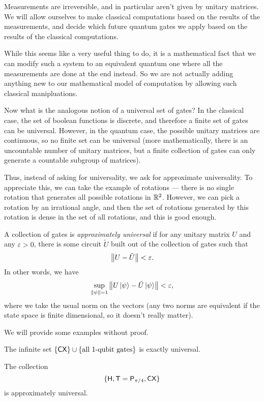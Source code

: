 Measurements are irreversible, and in particular aren't given by unitary matrices. We will allow ourselves to make classical computations based on the results of the measurements, and decide which future quantum gates we apply based on the results of the classical computations.

While this seems like a very useful thing to do, it is a mathematical fact that we can modify such a system to an equivalent quantum one where all the measurements are done at the end instead. So we are not actually adding anything new to our mathematical model of computation by allowing such classical manipluations.

Now what is the analogous notion of a universal set of gates? In the classical case, the set of boolean functions is discrete, and therefore a finite set of gates can be universal. However, in the quantum case, the possible unitary matrices are continuous, so no finite set can be universal (more mathematically, there is an uncountable number of unitary matrices, but a finite collection of gates can only generate a countable subgroup of matrices).

Thus, instead of asking for universality, we ask for approximate universality. To appreciate this, we can take the example of rotations --- there is no single rotation that generates all possible rotations in $\mathbb{R}^2$. However, we can pick a rotation by an irrational angle, and then the set of rotations generated by this rotation is dense in the set of all rotations, and this is good enough.

\begin{defi}
  A collection of gates is \emph{approximately universal} if for any unitary matrix $U$ and any $\varepsilon > 0$, there is some circuit $\tilde{U}$ built out of the collection of gates such that
  \[
    \left\lVert U - \tilde{U}\right\rVert < \varepsilon.
  \]
  In other words, we have
  \[
    \sup_{\left\lVert \psi\right\rVert = 1} \left\lVert U\left\lvert \psi\right\rangle - \tilde{U} \left\lvert \psi\right\rangle\right\rVert < \varepsilon,
  \]
  where we take the usual norm on the vectors (any two norms are equivalent if the state space is finite dimensional, so it doesn't really matter).
\end{defi}

We will provide some examples without proof.
\begin{eg}
  The infinite set $\{\mathsf{CX}\} \cup \{\text{all $1$-qubit gates}\}$ is exactly universal.
\end{eg}

\begin{eg}
  The collection
  \[
    \{\mathsf{H}, \mathsf{T} = \mathsf{P}_{\pi/4}, \mathsf{CX}\}
  \]
  is approximately universal.
\end{eg}


